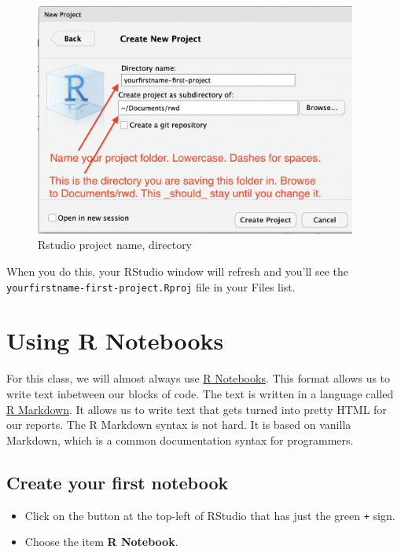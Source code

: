 \documentclass[]{book}
\providecommand{\tightlist}{%
  \setlength{\itemsep}{0pt}\setlength{\parskip}{0pt}}
\begin{document}
\begin{figure}
\centering
\includegraphics[width=4.16667in]{_images/02-rstudio-newproject.png}
\caption{Rstudio project name, directory}
\end{figure}

When you do this, your RStudio window will refresh and you'll see the
\texttt{yourfirstname-first-project.Rproj} file in your Files list.

\section{Using R Notebooks}\label{using-r-notebooks}

For this class, we will almost always use
\href{https://rmarkdown.rstudio.com/lesson-10.html}{R Notebooks}. This
format allows us to write text inbetween our blocks of code. The text is
written in a language called
\href{https://rmarkdown.rstudio.com/lesson-1.html}{R Markdown}. It
allows us to write text that gets turned into pretty HTML for our
reports. The R Markdown syntax is not hard. It is based on vanilla
Markdown, which is a common documentation syntax for programmers.

\subsection{Create your first
notebook}\label{create-your-first-notebook}

\begin{itemize}
\tightlist
\item
  Click on the button at the top-left of RStudio that has just the green
  \texttt{+} sign.
\item
  Choose the item \textbf{R Notebook}.
\end{itemize}
\end{document}
